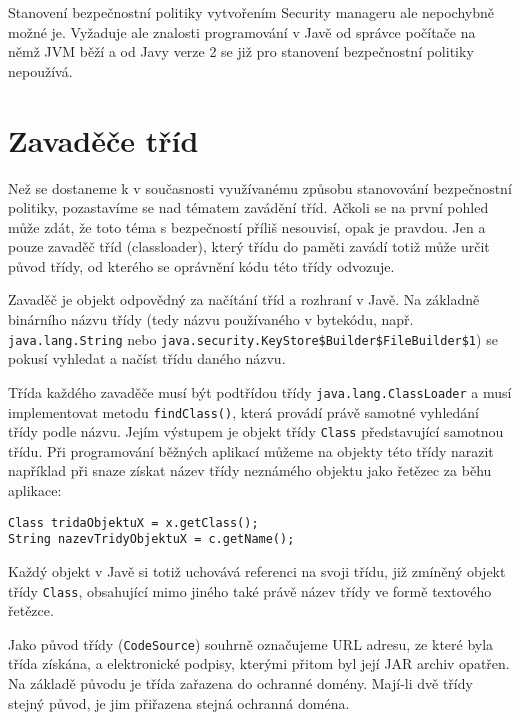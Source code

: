 Stanovení bezpečnostní politiky vytvořením Security manageru ale nepochybně možné je. Vyžaduje ale znalosti programování v Javě od správce počítače na němž JVM běží a od Javy verze 2 se již pro stanovení bezpečnostní politiky nepoužívá.

\section{Zavaděče tříd}

Než se dostaneme k v současnosti využívanému způsobu stanovování bezpečnostní politiky, pozastavíme se nad tématem zavádění tříd.
Ačkoli se na první pohled může zdát, že toto téma s bezpečností příliš nesouvisí, opak je pravdou.
Jen a pouze zavaděč tříd (classloader), který třídu do paměti zavádí totiž může určit původ třídy, od kterého se oprávnění kódu této třídy odvozuje.

Zavaděč je objekt odpovědný za načítání tříd a rozhraní v Javě. Na základně binárního názvu třídy (tedy názvu používaného v bytekódu, např. {\tt java.lang.String} nebo {\tt java.security.KeyStore\$Builder\$FileBuilder\$1}) se pokusí vyhledat a načíst třídu daného názvu. \cite{refClassLoader}

Třída každého zavaděče musí být podtřídou třídy {\tt java.lang.ClassLoader} a musí implementovat metodu {\tt findClass()}, která provádí právě samotné vyhledání třídy podle názvu. Jejím výstupem je objekt třídy {\tt Class} představující samotnou třídu. Při programování běžných aplikací můžeme na objekty této třídy narazit například při snaze získat název třídy neznámého objektu jako řetězec za běhu aplikace: \cite{refClassLoader}

\begin{verbatim}
Class tridaObjektuX = x.getClass();
String nazevTridyObjektuX = c.getName();
\end{verbatim}

Každý objekt v Javě si totiž uchovává referenci na svoji třídu, již zmíněný objekt třídy {\tt Class}, obsahující mimo jiného také právě název třídy ve formě textového řetězce.

Jako původ třídy ({\tt CodeSource}) souhrně označujeme URL adresu, ze které byla třída získána, a elektronické podpisy, kterými přitom byl její JAR archiv opatřen.
Na základě původu je třída zařazena do ochranné domény. Mají-li dvě třídy stejný původ, je jim přiřazena stejná ochranná doména. \cite[5.1]{oaks}\cite{sourceSecureClassLoader}

